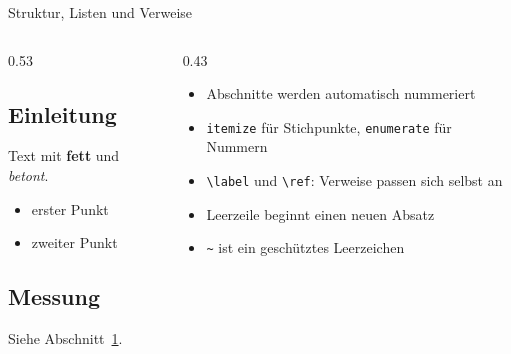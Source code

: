 \begin{frame}[fragile]{Struktur, Listen und Verweise}
  \begin{columns}[c]
    \begin{column}{0.53\textwidth}
\begin{code}
\section{Einleitung}
\label{sec:einleitung}

Text mit \textbf{fett} und \emph{betont}.

\begin{itemize}
  \item erster Punkt
  \item zweiter Punkt
\end{itemize}

\subsection{Messung}
Siehe Abschnitt~\ref{sec:einleitung}.
\end{code}
    \end{column}
    \begin{column}{0.43\textwidth}
      \begin{itemize}
        \item Abschnitte werden automatisch nummeriert
        \item \texttt{itemize} für Stichpunkte, \texttt{enumerate} für Nummern
        \item \texttt{\textbackslash label} und \texttt{\textbackslash ref}: Verweise passen sich selbst an
        \item Leerzeile beginnt einen neuen Absatz
        \item \texttt{\textasciitilde} ist ein geschütztes Leerzeichen
      \end{itemize}
    \end{column}
  \end{columns}
\end{frame}

